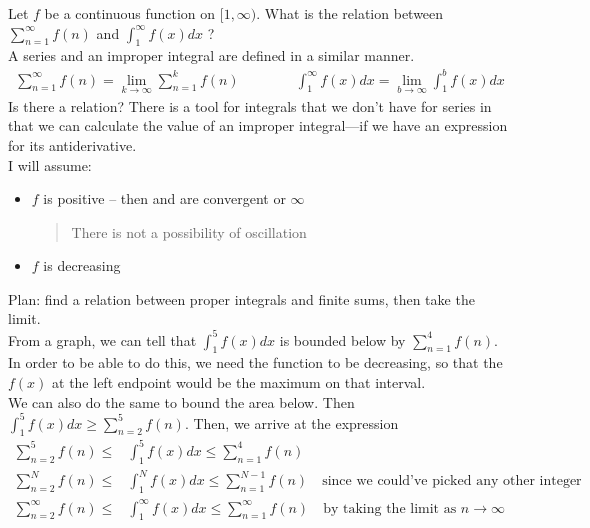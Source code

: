 \documentclass[../13.tex]{subfiles}
\begin{document}
Let \(f\) be a continuous function on \([1, \infty)\). What is the relation between $\sum_{n = 1}^{\infty} f(n)$ and $\int_{1}^{\infty} {f(x)} dx$ ? \\
A series and an improper integral are defined in a similar manner.
\begin{align*}
    \sum_{n = 1}^{\infty} f(n) = \lim_{k\to\infty} \sum_{n = 1}^{k} f(n) \qquad \qquad \int_{1}^{\infty} {f(x)} dx = \lim_{b\to\infty} \int_{1}^{b} {f(x)} dx
\end{align*}
Is there a relation? There is a tool for integrals that we don't have for series in that we can calculate the value of an improper integral---if we have an expression for its antiderivative. \\
I will assume: \begin{itemize}
    \item \(f\) is positive -- then  and  are convergent or \(\infty\) \begin{quote}
              There is not a possibility of oscillation
          \end{quote}
    \item \(f\) is decreasing
\end{itemize}
Plan: find a relation between proper integrals and finite sums, then take the limit. \\
From a graph, we can tell that \(\int_{1}^{5} {f(x)} dx\) is bounded below by \(\sum_{n = 1}^{4} f(n)\). In order to be able to do this, we need the function to be decreasing, so that the \(f(x)\) at the left endpoint would be the maximum on that interval. \\
We can also do the same to bound the area below. Then \(\int_{1}^{5} {f(x)} dx \geq \sum_{n = 2}^{5} f(n)\). Then, we arrive at the expression \begin{align*}
    \sum_{n = 2}^{5} f(n) \leq      & \int_{1}^{5} {f(x)} dx \leq \sum_{n = 1}^{4} f(n)                                                                                                        \\
    \sum_{n = 2}^{N} f(n) \leq      & \int_{1}^{N} {f(x)} dx \leq \sum_{n = 1}^{N-1} f(n) \quad \text{since we could've picked any other integer}                                              \\
    \sum_{n = 2}^{\infty} f(n) \leq & \int_{1}^{\infty} {f(x)} dx \leq \sum_{n = 1}^{\infty} f(n)                                            \quad \text{by taking the limit as } n \to \infty \\
\end{align*}
\end{document}
